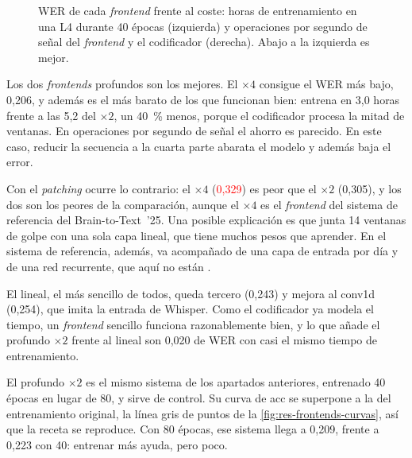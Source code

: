 \begin{figure}[htbp]
  \centering
  \caption{WER de cada \textit{frontend} frente al coste: horas de entrenamiento en una L4 durante 40 épocas (izquierda) y operaciones por segundo de señal del \textit{frontend} y el codificador (derecha). Abajo a la izquierda es mejor.}
  \label{fig:res-frontends-coste}
\end{figure}

Los dos \textit{frontends} profundos son los mejores. El $\times 4$ consigue el WER más bajo, 0,206, y además es el más barato de los que funcionan bien: entrena en 3,0 horas frente a las 5,2 del $\times 2$, un 40~\% menos, porque el codificador procesa la mitad de ventanas. En operaciones por segundo de señal el ahorro es parecido. En este caso, reducir la secuencia a la cuarta parte abarata el modelo y además baja el error.

Con el \textit{patching} ocurre lo contrario: el $\times 4$ (\textcolor{red}{0,329}) es peor que el $\times 2$ (0,305), y los dos son los peores de la comparación, aunque el $\times 4$ es el \textit{frontend} del sistema de referencia del Brain-to-Text~'25. Una posible explicación es que junta 14 ventanas de golpe con una sola capa lineal, que tiene muchos pesos que aprender. En el sistema de referencia, además, va acompañado de una capa de entrada por día y de una red recurrente, que aquí no están \cite{b2t25}.

El lineal, el más sencillo de todos, queda tercero (0,243) y mejora al conv1d (0,254), que imita la entrada de Whisper. Como el codificador ya modela el tiempo, un \textit{frontend} sencillo funciona razonablemente bien, y lo que añade el profundo $\times 2$ frente al lineal son 0,020 de WER con casi el mismo tiempo de entrenamiento.

El profundo $\times 2$ es el mismo sistema de los apartados anteriores, entrenado 40 épocas en lugar de 80, y sirve de control. Su curva de acc se superpone a la del entrenamiento original, la línea gris de puntos de la \cref{fig:res-frontends-curvas}, así que la receta se reproduce. Con 80 épocas, ese sistema llega a 0,209, frente a 0,223 con 40: entrenar más ayuda, pero poco.

